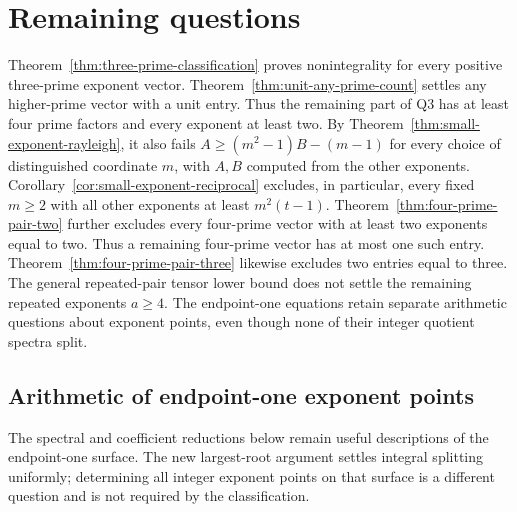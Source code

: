 \section{Remaining questions}
\label{sec:open}

Theorem~\ref{thm:three-prime-classification} proves nonintegrality for
every positive three-prime exponent vector.
Theorem~\ref{thm:unit-any-prime-count} settles any higher-prime vector
with a unit entry. Thus the remaining part of Q3 has at least four
prime factors and every exponent at least two.
By Theorem~\ref{thm:small-exponent-rayleigh}, it also fails
$A\geq(m^2-1)B-(m-1)$ for every choice of distinguished coordinate
$m$, with $A,B$ computed from the other exponents.
Corollary~\ref{cor:small-exponent-reciprocal} excludes, in particular,
every fixed $m\geq2$ with all other exponents at least $m^2(t-1)$.
Theorem~\ref{thm:four-prime-pair-two} further excludes every four-prime
vector with at least two exponents equal to two. Thus a remaining
four-prime vector has at most one such entry.
Theorem~\ref{thm:four-prime-pair-three} likewise excludes two entries
equal to three. The general repeated-pair tensor lower bound does
not settle the remaining repeated exponents $a\geq4$.
The endpoint-one equations retain separate arithmetic questions about
exponent points, even though none of their integer quotient spectra split.

\subsection{Arithmetic of endpoint-one exponent points}

The spectral and coefficient reductions below remain useful descriptions
of the endpoint-one surface. The new largest-root argument settles
integral splitting uniformly; determining all integer exponent points
on that surface is a different question and is not required by the
classification.

